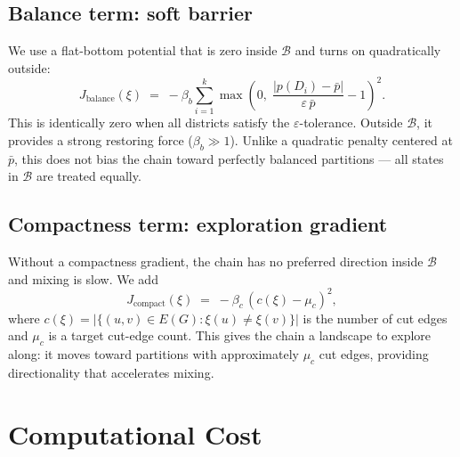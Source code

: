 \documentclass[11pt]{article}
\newcommand{\pbar}{\bar{p}}
\begin{document}
\subsection{Balance term: soft barrier}

We use a flat-bottom potential that is zero inside $\mathcal{B}$ and turns on quadratically outside:
\[
J_{\mathrm{balance}}(\xi) \;=\; -\beta_b \sum_{i=1}^{k} \max\!\left(0,\; \frac{|p(D_i) - \pbar|}{\varepsilon\,\pbar} - 1\right)^{\!2}.
\]
This is identically zero when all districts satisfy the $\varepsilon$-tolerance. Outside $\mathcal{B}$, it provides a strong restoring force ($\beta_b \gg 1$). Unlike a quadratic penalty centered at $\pbar$, this does not bias the chain toward perfectly balanced partitions --- all states in $\mathcal{B}$ are treated equally.

\subsection{Compactness term: exploration gradient}

Without a compactness gradient, the chain has no preferred direction inside $\mathcal{B}$ and mixing is slow. We add
\[
J_{\mathrm{compact}}(\xi) \;=\; -\beta_c\, (c(\xi) - \mu_c)^2,
\]
where $c(\xi) = |\{(u,v) \in E(G) : \xi(u) \neq \xi(v)\}|$ is the number of cut edges and $\mu_c$ is a target cut-edge count. This gives the chain a landscape to explore along: it moves toward partitions with approximately $\mu_c$ cut edges, providing directionality that accelerates mixing.


\section{Computational Cost}\label{sec:cost}
\end{document}
